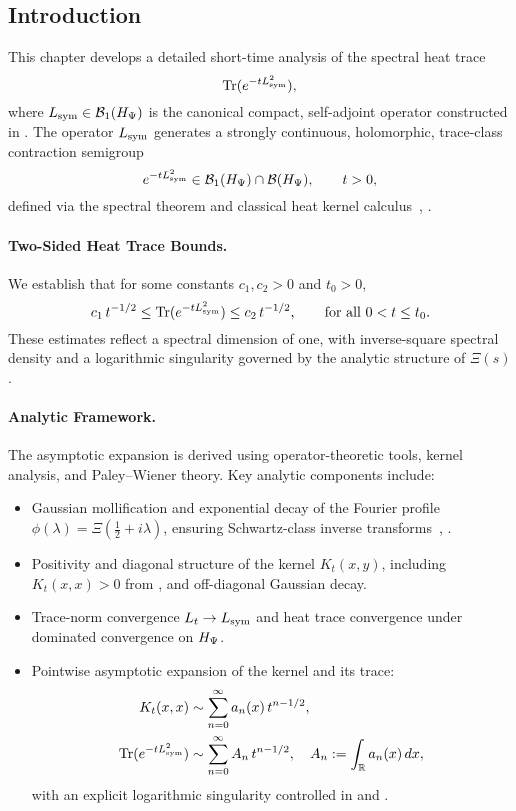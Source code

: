 \subsection*{Introduction}
\label{sec:intro_heat_kernel_asymptotics}

This chapter develops a detailed short-time analysis of the spectral heat trace
\[
\operatorname{Tr}(e^{-t L_{\mathrm{sym}}^2}),
\]
where \( L_{\mathrm{sym}} \in \mathcal{B}_1(H_{\Psi}) \) is the canonical compact, self-adjoint operator constructed in . The operator \( L_{\mathrm{sym}} \) generates a strongly continuous, holomorphic, trace-class contraction semigroup
\[
e^{-t L_{\mathrm{sym}}^2} \in \mathcal{B}_1(H_{\Psi}) \cap \mathcal{B}(H_{\Psi}), \qquad t > 0,
\]
defined via the spectral theorem and classical heat kernel calculus~\cite[Ch.~X]{ReedSimon1978IV}, \cite[Ch.~3]{Simon2005TraceIdeals}.

\paragraph{Two-Sided Heat Trace Bounds.}
We establish that for some constants \( c_1, c_2 > 0 \) and \( t_0 > 0 \),
\[
c_1\, t^{-1/2} \le \operatorname{Tr}(e^{-t L_{\mathrm{sym}}^2}) \le c_2\, t^{-1/2}, \qquad \text{for all } 0 < t \le t_0.
\]
These estimates reflect a spectral dimension of one, with inverse-square spectral density and a logarithmic singularity governed by the analytic structure of \( \Xi(s) \).

\paragraph{Analytic Framework.}
The asymptotic expansion is derived using operator-theoretic tools, kernel analysis, and Paley–Wiener theory. Key analytic components include:
\begin{itemize}
  \item Gaussian mollification and exponential decay of the Fourier profile \( \phi(\lambda) = \Xi(\tfrac{1}{2} + i\lambda) \), ensuring Schwartz-class inverse transforms~\cite[Ch.~IX]{ReedSimon1975II}, \cite[Ch.~9]{Levin1996EntireLectures}.
  \item Positivity and diagonal structure of the kernel \( K_t(x, y) \), including \( K_t(x, x) > 0 \) from , and off-diagonal Gaussian decay.
  \item Trace-norm convergence \( L_t \to L_{\mathrm{sym}} \) and heat trace convergence under dominated convergence on \( H_{\Psi} \).
  \item Pointwise asymptotic expansion of the kernel and its trace:
  \[
  \begin{aligned}
  K_t(x,x) &\sim \sum_{n=0}^\infty a_n(x)\, t^{n - 1/2}, \\
  \operatorname{Tr}(e^{-t L_{\mathrm{sym}}^2}) &\sim \sum_{n=0}^\infty A_n\, t^{n - 1/2}, \quad A_n := \int_{\mathbb{R}} a_n(x)\, dx,
  \end{aligned}
  \]
  with an explicit logarithmic singularity controlled in  and .
\end{itemize}

